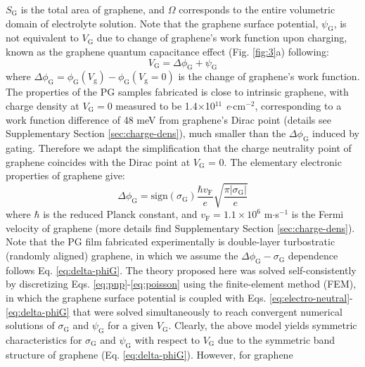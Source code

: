 \documentclass[journal=langd5,email=true, hyperref=true, keywords=false]{achemso}
\begin{document}
$S_{\mathrm{G}}$ is the total area of graphene, and $\Omega$
corresponds to the entire volumetric domain of electrolyte
solution. Note that the graphene surface potential,
$\psi_{\mathrm{G}}$, is not equivalent to $V_{\mathrm{G}}$ due to
change of graphene's work function upon charging, known as the
graphene quantum capacitance effect\cite{Xia_2009} (Fig.
\ref{fig:3}a) following:
\begin{equation}
  \label{eq:Vg}
  V_{\mathrm{G}} = \Delta \phi_{\mathrm{G}} + \psi_{\mathrm{G}}
\end{equation}
where
$\Delta \phi_{\mathrm{G}} = \phi_{\mathrm{G}}(V_{\mathrm{g}}) -
\phi_{\mathrm{G}}(V_{\mathrm{g}}=0)$ is the change of graphene’s work
function. The properties of the PG samples fabricated is close to
intrinsic graphene, with charge density at $V_{\mathrm{G}}=0$ measured
to be 1.4$\times$10$^{11}$ \textit{e}$\cdot$cm$^{-2}$, corresponding
to a work function difference of 48 meV from graphene's Dirac point
(details see Supplementary Section \ref{sec:charge-dens}), much
smaller than the $\Delta \phi_{\mathrm{G}}$ induced by gating.
Therefore we adapt the simplification that the charge neutrality point
of graphene coincides with the Dirac point at $V_{\mathrm{G}}$ =
0. The elementary electronic properties of graphene give:
\begin{equation}
  \label{eq:delta-phiG}
  \Delta \phi_{\mathrm{G}} = \mathrm{sign}(\sigma_{\mathrm{G}}) \frac{\hbar v_{\mathrm{F}}}{e}
  \sqrt{\frac{\pi |\sigma_{\mathrm{G}}|}{e}}
\end{equation}
where $\hbar$ is the reduced Planck constant, and
$v_{\mathrm{F}}=1.1\times10^{6}$ m$\cdot$s$^{-1}$ is the Fermi
velocity of graphene (more details find Supplementary Section
\ref{sec:charge-dens}).  Note that the PG film fabricated
experimentally is double-layer turbostratic (randomly aligned)
graphene, in which we assume the
$\Delta \phi_{\mathrm{G}} - \sigma_{\mathrm{G}}$ dependence follows
Eq. \eqref{eq:delta-phiG}. The theory proposed here was solved
self-consistently by discretizing
Eqs. \eqref{eq:pnp}-\eqref{eq:poisson} using the finite-element method
(FEM), in which the graphene surface potential is coupled with
Eqs. \eqref{eq:electro-neutral}-\eqref{eq:delta-phiG} that were solved
simultaneously to reach convergent numerical solutions of
$\sigma_{\mathrm{G}}$ and $\psi_{\mathrm{G}}$ for a given
$V_{\mathrm{G}}$. Clearly, the above model yields symmetric
characteristics for $\sigma_{\mathrm{G}}$ and $\psi_{\mathrm{G}}$ with
respect to $V_{\mathrm{G}}$ due to the symmetric band structure of
graphene (Eq. \eqref{eq:delta-phiG}). However, for graphene
\end{document}
